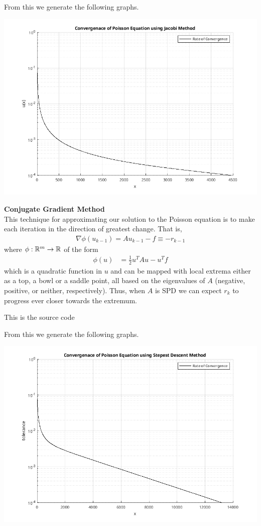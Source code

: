 \documentclass[12pt,a4paper]{report}
\begin{document}
From this we generate the following graphs.%

\includegraphics[scale=0.5]{ml04c.png} 

\noindent\textbf{Conjugate Gradient Method}\\

This technique for approximating our solution to the Poisson equation is to make each iteration in the direction of greatest change.  That is, 
\begin{align*}
	\nabla \phi(u_{k-1}) = Au_{k-1}-f \equiv -r_{k-1}
\end{align*}where $\phi: \mathbb{R}^m \to \mathbb{R}$ of the form
\begin{align*}
	\phi(u) &= \frac{1}{2}u^TAu-u^Tf
\end{align*}which is a quadratic function in $u$ and can be mapped with local extrema either as a top, a bowl or a saddle point, all based on the eigenvalues of $A$ (negative, positive, or neither, respectively).  Thus, when $A$ is SPD we can expect $r_{k}$ to progress ever closer towards the extremum.

This is the source code
	

From this we generate the following graphs.

\includegraphics[scale=0.5]{ml04d.png} 
\end{document}
